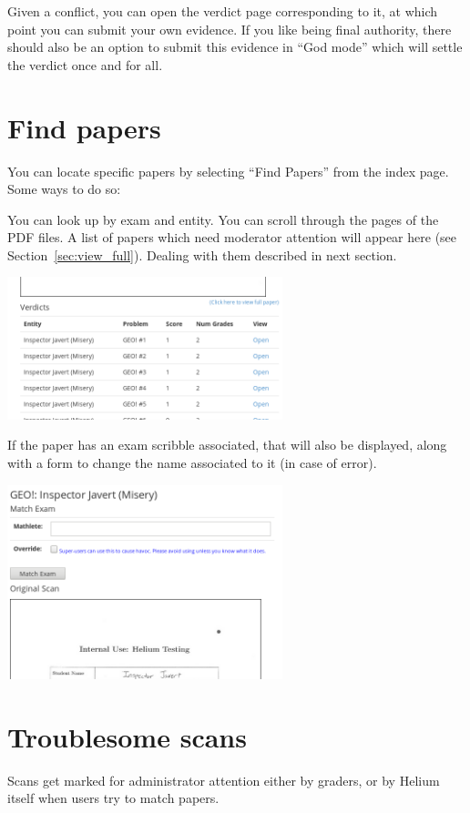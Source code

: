 Given a conflict, you can open the verdict page corresponding to it,
at which point you can submit your own evidence.
If you like being final authority,
there should also be an option to submit this evidence in ``God mode''
which will settle the verdict once and for all.
\section{Find papers}
You can locate specific papers
by selecting ``Find Papers'' from the index page.
Some ways to do so:
\begin{itemize}
	\ii You can look up by exam and entity.
	\ii You can scroll through the pages of the PDF files.
	\ii A list of papers which need moderator attention
	will appear here (see Section~\ref{sec:view_full}).
	Dealing with them described in next section.
\end{itemize}

\begin{center}
	\includegraphics[width=0.6\textwidth]{images/viewpaper2.png}
\end{center}

If the paper has an exam scribble associated,
that will also be displayed,
along with a form to change the name associated to it
(in case of error).

\begin{center}
	\includegraphics[width=0.6\textwidth]{images/viewpaper1.png}
\end{center}

\section{Troublesome scans}
Scans get marked for administrator attention either by graders,
or by Helium itself when users try to match papers.

